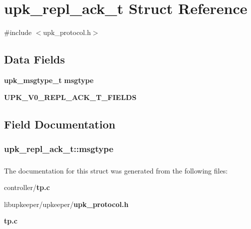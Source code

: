 \section{upk\_\-repl\_\-ack\_\-t Struct Reference}
\label{structupk__repl__ack__t}


{\ttfamily \#include $<$upk\_\-protocol.h$>$}

\subsection*{Data Fields}
\begin{DoxyCompactItemize}
\item 
{\bf upk\_\-msgtype\_\-t} {\bf msgtype}
\item 
{\bf UPK\_\-V0\_\-REPL\_\-ACK\_\-T\_\-FIELDS}
\end{DoxyCompactItemize}


\subsection{Field Documentation}
\subsubsection[{msgtype}]{ {\bf upk\_\-repl\_\-ack\_\-t::msgtype}}\label{structupk__repl__ack__t_a5d8857d183b94e780b2ed10282471908}
\subsubsection[{UPK\_\-V0\_\-REPL\_\-ACK\_\-T\_\-FIELDS}]{}\label{structupk__repl__ack__t_a53ee389198f457d645700611ac4eb61e}


The documentation for this struct was generated from the following files:\begin{DoxyCompactItemize}
\item 
controller/{\bf tp.c}\item 
libupkeeper/upkeeper/{\bf upk\_\-protocol.h}\item 
{\bf tp.c}\end{DoxyCompactItemize}
